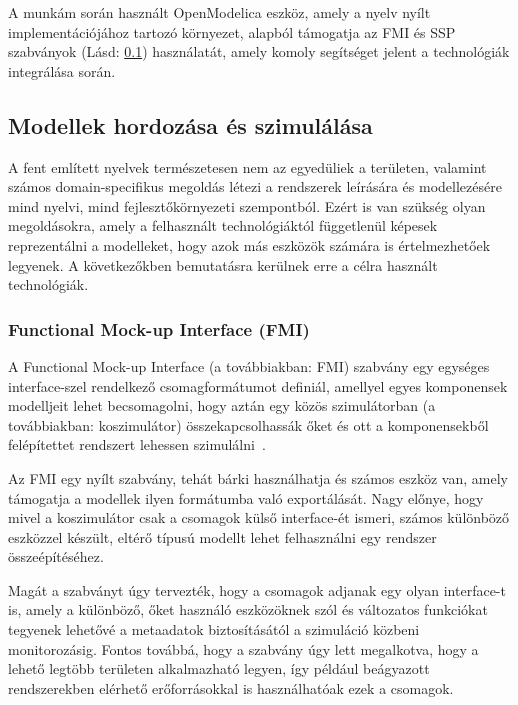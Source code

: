         A munkám során használt OpenModelica eszköz, amely a nyelv nyílt implementációjához tartozó
        környezet, alapból támogatja az FMI és SSP szabványok (Lásd: \ref{sec:ModellHord}) használatát, amely komoly segítséget jelent a technológiák
        integrálása során.

    \subsection{Modellek hordozása és szimulálása} \label{sec:ModellHord}
    A fent említett nyelvek természetesen nem az egyedüliek a területen, valamint számos domain-specifikus megoldás létezi a rendszerek leírására és modellezésére mind nyelvi, mind fejlesztőkörnyezeti szempontból.
    Ezért is van szükség olyan megoldásokra, amely a felhasznált technológiáktól függetlenül képesek reprezentálni a modelleket, hogy azok más eszközök számára is értelmezhetőek legyenek. A következőkben bemutatásra kerülnek erre a célra használt technológiák.
    
        \subsubsection{Functional Mock-up Interface (FMI)} \label{sec:fmi}
        A Functional Mock-up Interface (a továbbiakban: FMI) szabvány egy egységes interface-szel
        rendelkező csomagformátumot definiál, amellyel egyes komponensek modelljeit lehet becsomagolni,
        hogy aztán egy közös szimulátorban (a továbbiakban: koszimulátor) összekapcsolhassák őket és ott a komponensekből felépítettet
        rendszert lehessen szimulálni~\cite{FMI2023}.
        
        Az FMI egy nyílt szabvány, tehát bárki használhatja és számos eszköz van,
        amely támogatja a modellek ilyen formátumba való exportálását. Nagy előnye, hogy mivel a koszimulátor
        csak a csomagok külső interface-ét ismeri,
        számos különböző eszközzel készült, eltérő típusú modellt lehet felhasználni egy rendszer összeépítéséhez.
        
        Magát a szabványt úgy tervezték, hogy a csomagok adjanak egy olyan interface-t is,
        amely a különböző, őket használó eszközöknek szól és változatos funkciókat tegyenek lehetővé a
        metaadatok biztosításától a szimuláció közbeni monitorozásig. Fontos továbbá, hogy a szabvány úgy
        lett megalkotva, hogy a lehető legtöbb területen alkalmazható legyen, így például beágyazott
        rendszerekben elérhető erőforrásokkal is használhatóak ezek a csomagok.

